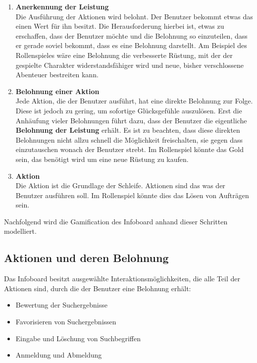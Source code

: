 \documentclass[12pt,twoside]{book}
\begin{document}
\begin{enumerate}
  \item \textbf{Anerkennung der Leistung} \\
  Die Ausführung der Aktionen wird belohnt. Der Benutzer bekommt etwas das einen Wert für ihn besitzt. Die Herausforderung hierbei ist, etwas zu erschaffen, dass der Benutzer möchte und die Belohnung so einzuteilen, dass er gerade soviel bekommt, dass es eine Belohnung darstellt. Am Beispiel des Rollenspieles wäre eine Belohnung die verbesserte Rüstung, mit der der gespielte Charakter widerstandsfähiger wird und neue, bisher verschlossene Abenteuer bestreiten kann.
  \item \textbf{Belohnung einer Aktion}\\
  Jede Aktion, die der Benutzer ausführt, hat eine direkte Belohnung zur Folge. Diese ist jedoch zu gering, um sofortige Glücksgefühle auszulösen. Erst die  Anhäufung vieler Belohnungen führt dazu, dass der Benutzer die eigentliche \textbf{Belohnung der Leistung} erhält. Es ist zu beachten, dass diese direkten Belohnungen nicht allzu schnell die Möglichkeit freischalten, sie gegen dass einzutauschen wonach der Benutzer strebt. Im Rollenspiel könnte das Gold sein, das benötigt wird um eine neue Rüstung zu kaufen.
  \item \textbf{Aktion}\\
  Die Aktion ist die Grundlage der Schleife. Aktionen sind das was der Benutzer ausführen soll. Im Rollenspiel könnte dies das Lösen von Aufträgen sein.
\end{enumerate}

Nachfolgend wird die Gamification des Infoboard anhand dieser Schritten modelliert.

\subsection{Aktionen und deren Belohnung}

Das Infoboard besitzt ausgewählte Interaktionsmöglichkeiten, die alle Teil der Aktionen sind, durch die der Benutzer eine Belohnung erhält:

\begin{itemize}
  \item Bewertung der Suchergebnisse
  \item Favorisieren von Suchergebnissen
  \item Eingabe und Löschung von Suchbegriffen
  \item Anmeldung und Abmeldung
\end{itemize}
\end{document}
